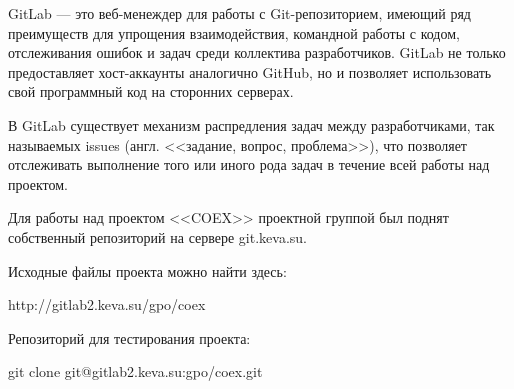 GitLab --- это веб-менеждер для работы с Git-репозиторием, имеющий ряд преимуществ для упрощения взаимодействия, командной работы с кодом, отслеживания ошибок и задач среди коллектива разработчиков. GitLab не только предоставляет хост-аккаунты аналогично GitHub, но и позволяет использовать свой программный код на сторонних серверах.\cite{gitlab} 

В GitLab существует механизм распредления задач между разработчиками, так называемых issues (англ. <<задание, вопрос, проблема>>), что позволяет отслеживать выполнение того или иного рода задач в течение всей работы над проектом.

Для работы над проектом <<COEX>> проектной группой был поднят собственный репозиторий на сервере git.keva.su.

Исходные файлы проекта можно найти здесь:

http://gitlab2.keva.su/gpo/coex

Репозиторий для тестирования проекта:

git clone git@gitlab2.keva.su:gpo/coex.git
